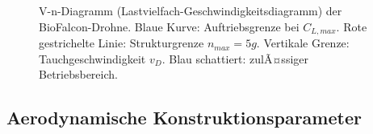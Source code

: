 ﻿\documentclass[12pt,a4paper]{article}
\theoremstyle{remark}
\begin{document}
\begin{figure}[H]
		\caption{V-n-Diagramm (Lastvielfach-Geschwindigkeitsdiagramm) der BioFalcon-Drohne.
			Blaue Kurve: Auftriebsgrenze bei $C_{L,max}$. Rote gestrichelte Linie:
			Strukturgrenze $n_{max} = 5g$. Vertikale Grenze: Tauchgeschwindigkeit $v_D$.
			Blau schattiert: zulÃ¤ssiger Betriebsbereich.}
		\label{fig:vn_diagramm}
	\end{figure}
	
	\subsection{Aerodynamische Konstruktionsparameter}
	\label{sec:kons_zusammenfassung}
	
\end{document}

